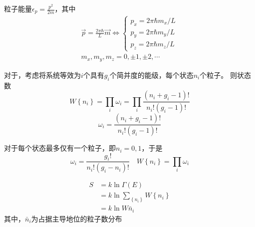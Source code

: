 \documentclass[12pt, a4paper, oneside]{ctexbook}
\newcommand{\hl}[1]{\hlbox{#1}}
\newcounter{#2}
\newcounter{#2}[#1]
\numberwithin{#2}{#1}
\begin{document}
          \begin{deduce}
            粒子能量\(\epsilon_p=\frac{p^2}{2 m}\)，其中
            \begin{equation}
              \begin{gathered}
                \vec{p}=\frac{2 \pi \hbar}{L} \vec{m} \Leftrightarrow\left\{\begin{array}{l}
                p_x=2 \pi \hbar m_x / L \\
                p_y=2 \pi \hbar m_y / L \\
                p_z=2 \pi \hbar m_z / L
                \end{array}\right. \\
                m_x, m_y, m_z=0, \pm 1, \pm 2, \cdots
                \end{gathered}
            \end{equation}
          \end{deduce}
          \begin{deduce}
            对于\hl{玻色子}，考虑将系统等效为\(i\)个具有\(g_i\)个简并度的能级，每个状态\(n_i\)个粒子。
            则状态数
            \begin{equation}
              W\left\{n_i\right\}=\prod_i \omega_i=\prod_i \frac{\left(n_i+g_i-1\right) !}{n_{i} !\left(g_i-1\right) !}
            \end{equation}
            \begin{equation}
              \omega_i=\frac{\left(n_i+g_i-1\right) !}{n_{i} !\left(g_i-1\right) !}
            \end{equation}

          \end{deduce}
          \begin{deduce}
            对于\hl{费米子}每个状态最多仅有一个粒子，即\(n_i=0,1\)，于是
            \begin{equation}
              \omega_i=\frac{g_{i} !}{n_{i} !\left(g_i-n_i\right) !} \quad W\left\{n_i\right\}=\prod_i \omega_i
            \end{equation}
          \end{deduce}
          \begin{deduce}
            \begin{equation}
              \begin{aligned}
                S & =k \ln \Gamma(E) \\
                & =k \ln \sum_{\left\{n_i\right\}} W\left\{n_i\right\}\\
                &=k\ln W{\bar n_i}
                \end{aligned}
            \end{equation}
            其中，\(\bar n_i\)为占据主导地位的粒子数分布
          \end{deduce}
\end{document}
